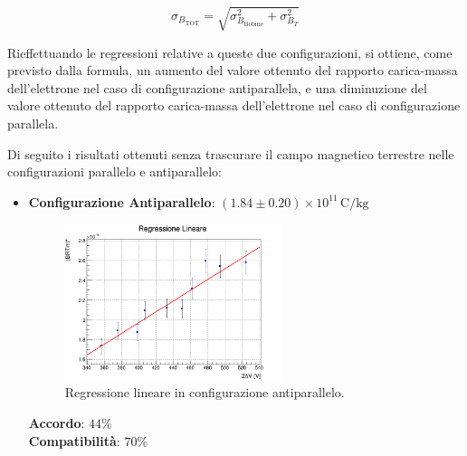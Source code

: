\documentclass[a4paper,12pt]{article}
\begin{document}
\begin{equation}
    \sigma_{B_{\text{TOT}}} = \sqrt{\sigma_{B_{\text{Bobine}}}^2 + \sigma_{B_T}^2} \label{eq:B_tot_uncertainty}
\end{equation}

Rieffettuando le regressioni relative a queste due configurazioni, si ottiene, come previsto dalla formula, un aumento del valore ottenuto del rapporto carica-massa dell’elettrone nel caso di configurazione antiparallela, e una diminuzione del valore ottenuto del rapporto carica-massa dell’elettrone nel caso di configurazione parallela.

Di seguito i risultati ottenuti senza trascurare il campo magnetico terrestre nelle configurazioni parallelo e antiparallelo:

\begin{itemize}

    \item \textbf{Configurazione Antiparallelo}: \( (1.84 \pm 0.20) \times 10^{11} \, \text{C/kg}\)
    \begin{figure}[H]
        \centering
        \includegraphics[width=0.6\textwidth]{correz_regr_antiparallelo.png}
        \caption{Regressione lineare in configurazione antiparallelo.}
        \label{fig:correz_regr_antiparallelo}
    \end{figure}
    \textbf{Accordo}: \(44\%\) \\
    \textbf{Compatibilità}: \(70\%\)
    \vspace{0.5cm}


\end{itemize}
\end{document}
